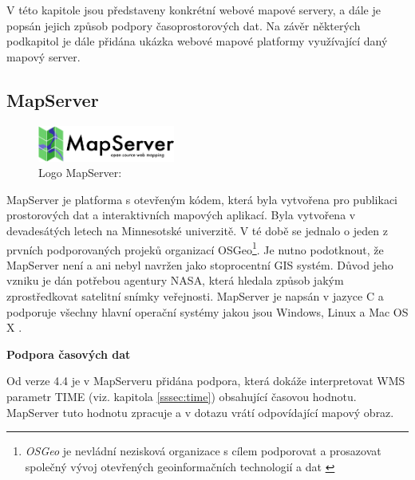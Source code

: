 V této kapitole jsou představeny konkrétní webové mapové servery,
a dále je popsán jejich způsob podpory časoprostorových dat. Na závěr některých podkapitol je dále přidána ukázka webové mapové platformy využívající daný mapový server.

\subsection{MapServer}
\label{sssec:mapserver}

\begin{figure}[h!]
	\centering
	\includegraphics[width=0.4\textwidth]{./img/mapserver-logo.png}
    \caption{Logo MapServer: \cite{mapserver_about}}
	\label{fig:mapserver-logo}
\end{figure}
\bigskip

MapServer je platforma s otevřeným kódem, která byla vytvořena pro
publikaci prostorových dat a interaktivních mapových aplikací. Byla
vytvořena v devadesátých letech na Minnesotské univerzitě. V té době se
jednalo o jeden z prvních podporovaných projeků organizací OSGeo\footnote{\textit{OSGeo} je nevládní nezisková organizace s cílem  podporovat a prosazovat společný vývoj otevřených geoinformačních technologií a dat \cite{osgeo}}. Je
nutno podotknout, že MapServer není a ani nebyl navržen jako
stoprocentní GIS systém. Důvod jeho vzniku je dán potřebou agentury
NASA, která hledala způsob jakým zprostředkovat satelitní snímky
veřejnosti. MapServer je napsán v jazyce C a podporuje všechny hlavní
operační systémy jakou jsou Windows, Linux a Mac OS X
\cite{mapserver_about}.

\bigskip
\noindent
\textbf{Podpora časových dat}

Od verze 4.4 je v MapServeru přidána podpora, která dokáže
interpretovat WMS parametr TIME (viz. kapitola \ref{sssec:time}) obsahující časovou hodnotu. MapServer
tuto hodnotu zpracuje a v dotazu vrátí odpovídající mapový obraz.

